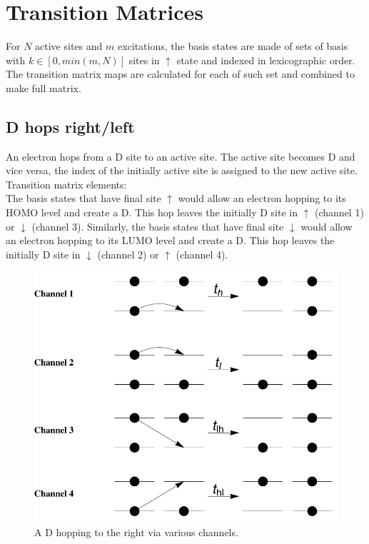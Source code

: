 \documentclass[a4paper,twocolumn]{revtex4-1} %
\newcommand{\da}{\downarrow}
\newcommand{\ua}{\uparrow}
\begin{document}
\section{Transition Matrices}
For $N$ active sites and $m$ excitations,
the basis states are made of sets of basis with $k\in [0,min(m,N)]$ sites in $\ua$ state
and indexed in lexicographic order.
The transition matrix maps are calculated for each of such set and combined to make full matrix.


\subsection{D hops right/left}
An electron hops from a D site to an active site.
The active site becomes D and vice versa, the index of the initially active site is assigned to the new active site. 
\\Transition matrix elements:\\
The basis states that have final site $\ua$ would allow 
an electron hopping to its HOMO level and create a D.
This hop leaves the initially D site in $\ua$ (channel 1) or $\da$  (channel 3).
Similarly,
the basis states that have final site $\da$ would allow 
an electron hopping to its LUMO level and create a D.
This hop leaves the initially D site in $\da$ (channel 2) or $\ua$  (channel 4).

\begin{figure}[htpb]
  \centering
  \includegraphics[width=0.4\columnwidth]{DhopsR}
  \caption{A D hopping to the right via various channels.
 \label{fig:dhops}}  
\end{figure}
\end{document}
